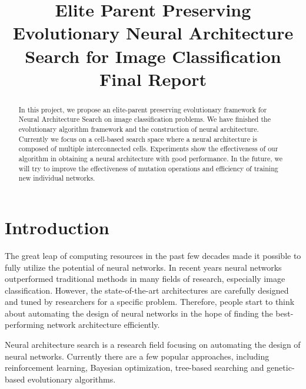 \documentclass[conference]{IEEEtran}
\begin{document}
  
  \title{Elite Parent Preserving Evolutionary Neural Architecture Search for Image Classification \\ Final Report}
  
  \author{
  }
  
  \maketitle
  
  \begin{abstract}
  In this project, we propose an elite-parent preserving evolutionary framework for Neural Architecture Search on image classification problems. We have finished the evolutionary algorithm framework and the construction of neural architecture. Currently we focus on a cell-based search space where a neural architecture is composed of multiple interconnected cells. Experiments show the effectiveness of our algorithm in obtaining a neural architecture with good performance. In the future, we will try to improve the effectiveness of mutation operations and efficiency of training new individual networks.
  
  \end{abstract}
  \IEEEpeerreviewmaketitle
  
  \section{Introduction}
      The great leap of computing resources in the past few decades made it possible to fully utilize the potential of neural networks. In recent years neural networks outperformed traditional methods in many fields of research, especially image classification. However, the state-of-the-art architectures are carefully designed and tuned by researchers for a specific problem. Therefore, people start to think about automating the design of neural networks in the hope of finding the best-performing network architecture efficiently.

      Neural architecture search is a research field focusing on automating the design of neural networks. Currently there are a few popular approaches, including reinforcement learning, Bayesian optimization, tree-based searching and genetic-based evolutionary algorithms. 
\end{document}
